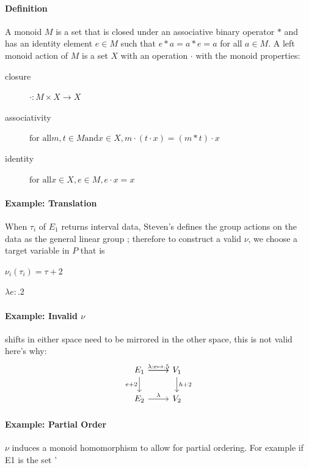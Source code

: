 \documentclass[../main.tex]{subfiles}
\begin{document}
\paragraph{Definition}
A monoid\cite{Monoid2021} $M$ is a set that is closed under an associative binary operator $\ast$ and has an identity element $e\in M$ such that $e\ast a= a \ast e = a$ for all $a \in M$.  A left monoid action \cite{SemigroupAction2021,ActionNLab} of $M$ is a set $X$ with an operation $\cdot$ with the monoid properties:
\begin{description}
    \item[closure] $\cdot: M\times X \rightarrow X$
    \item[associativity] $\text{for all} m,t \in M \text{and} x\in X, m\cdot(t\cdot x) = (m\ast t)\cdot x$ 
    \item[identity] $\text{for all} x\in X, e\in M,  e\cdot x = x$ 
\end{description}








\paragraph{Example: Translation}
When $\tau_{i}$ of $E_1$ returns interval data, Steven's defines the group actions on the data as the general linear group \cite{stevensTheoryScalesMeasurement1946,leaFormalizationMeasurementScale}; therefore to construct a valid $\nu$, we choose a target variable in $P$ that is

$\nu_i(\tau_i) = \tau + 2$

$\lambda e: .2$ 
\paragraph{Example: Invalid $\nu$}
shifts in either space need to be mirrored in the other space, this is not valid  here's why:
\begin{equation}
    \label{eq:nu_equation_bad}
    \begin{tikzcd}
        E_1 \arrow[r] \arrow[r, "\lambda:e\mapsto.5"] \arrow[d, "e+2"'] & V_1 \arrow[d, "h+2"] \\
        E_2 \arrow[r, "\lambda"]                                        & V_2                 
    \end{tikzcd}
\end{equation}

\paragraph{Example: Partial Order}
$\nu$ induces a monoid homomorphism to allow for partial ordering. For example if E1 is the set '{} 
\end{document}
